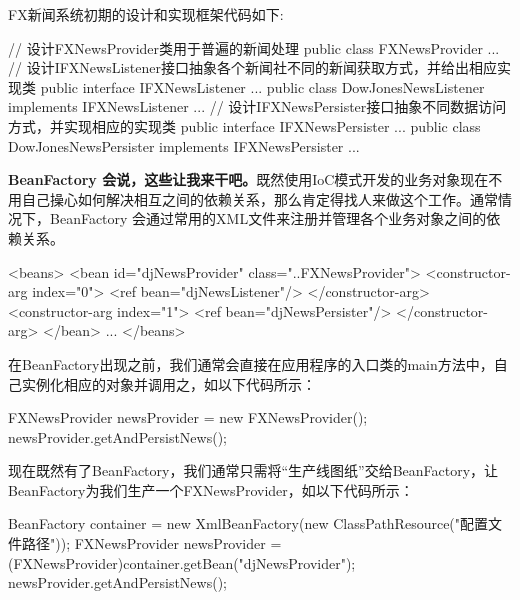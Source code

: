 FX新闻系统初期的设计和实现框架代码如下:

\begin{Java}
// 设计FXNewsProvider类用于普遍的新闻处理
public class FXNewsProvider { ... }
// 设计IFXNewsListener接口抽象各个新闻社不同的新闻获取方式，并给出相应实现类
public interface IFXNewsListener { ... } 
public class DowJonesNewsListener implements IFXNewsListener { ... }
// 设计IFXNewsPersister接口抽象不同数据访问方式，并实现相应的实现类
public interface IFXNewsPersister { ... } 
public class DowJonesNewsPersister implements IFXNewsPersister { ... }
\end{Java}

\textbf{BeanFactory 会说，这些让我来干吧。}既然使用IoC模式开发的业务对象现在不用自己操心如何解决相互之间的依赖关系，那么肯定得找人来做这个工作。通常情况下，BeanFactory 会通过常用的XML文件来注册并管理各个业务对象之间的依赖关系。

\begin{xml}
<beans>
    <bean id="djNewsProvider" class="..FXNewsProvider">     
        <constructor-arg  index="0">        
            <ref  bean="djNewsListener"/>  
        </constructor-arg> 
        <constructor-arg  index="1">        
            <ref  bean="djNewsPersister"/>      
        </constructor-arg>
    </bean>    
    ...  
</beans> 
\end{xml}

在BeanFactory出现之前，我们通常会直接在应用程序的入口类的main方法中，自己实例化相应的对象并调用之，如以下代码所示：

\begin{Java}
FXNewsProvider newsProvider = new FXNewsProvider();
newsProvider.getAndPersistNews(); 
\end{Java}

现在既然有了BeanFactory，我们通常只需将“生产线图纸”交给BeanFactory，让BeanFactory为我们生产一个FXNewsProvider，如以下代码所示：

\begin{Java}
BeanFactory container = new XmlBeanFactory(new ClassPathResource("配置文件路径")); 
FXNewsProvider newsProvider = (FXNewsProvider)container.getBean("djNewsProvider"); 
newsProvider.getAndPersistNews(); 
\end{Java}


